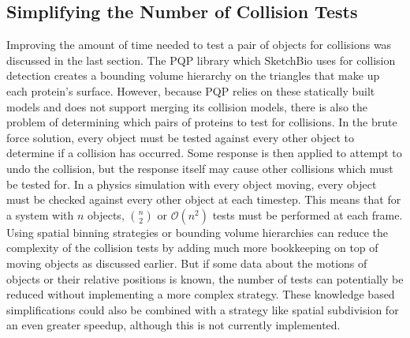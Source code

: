 \documentclass{article} %
\begin{document}
\subsection{Simplifying the Number of Collision Tests}
Improving the amount of time needed to test a pair of objects for collisions was discussed in the last section.  The PQP library which SketchBio uses for collision detection creates a bounding volume hierarchy on the triangles that make up each protein's surface.  However, because PQP relies on these statically built models and does not support merging its collision models, there is also the problem of determining which pairs of proteins to test for collisions.  In the brute force solution, every object must be tested against every other object to determine if a collision has occurred.  Some response is then applied to attempt to undo the collision, but the response itself may cause other collisions which must be tested for. In a physics simulation with every object moving, every object must be checked against every other object at each timestep. This means that for a system with $n$ objects, ${n \choose 2}$ or $\mathcal{O}(n^2)$ tests must be performed at each frame.  Using spatial binning strategies or bounding volume hierarchies can reduce the complexity of the collision tests by adding much more bookkeeping on top of moving objects as discussed earlier.  But if some data about the motions of objects or their relative positions is known, the number of tests can potentially be reduced without implementing a more complex strategy.  These knowledge based simplifications could also be combined with a strategy like spatial subdivision for an even greater speedup, although this is not currently implemented.
\end{document}

